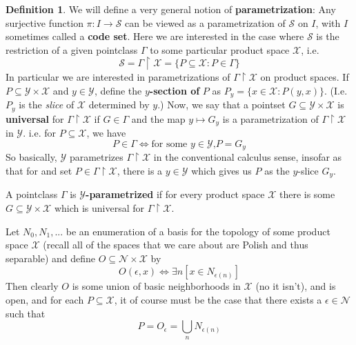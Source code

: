 \documentclass{article}
\theoremstyle{definition}
\newtheorem{definition}{Definition}[section]
\theoremstyle{plain}
\begin{document}
\begin{definition}
We will define a very general notion of \textbf{parametrization}: Any surjective function $\pi: I \to \mathcal{S}$ can be viewed as a parametrization of $\mathcal{S}$ on $I$, with $I$ sometimes called a \textbf{code set}. Here we are interested in the case where $\mathcal{S}$ is the restriction of a given pointclass $\Gamma$ to some particular product space $\mathcal{X}$, i.e. 
\[ \mathcal{S} = \Gamma  \restriction \mathcal{X} = \{P \subseteq \mathcal{X}: P \in \Gamma\} \]
In particular we are interested in parametrizations of $\Gamma \restriction \mathcal{X}$ on product spaces. If $P \subseteq \mathcal{Y} \times \mathcal{X}$ and $y \in \mathcal{Y}$, define the \textbf{$y$-section of} $P$ as $P_y = \{x \in \mathcal{X}: P(y,x)\}$. (I.e. $P_y$ is the \textit{slice} of $\mathcal{X}$ determined by $y$.) 
Now, we say that a pointset $G \subseteq \mathcal{Y} \times \mathcal{X}$ is \textbf{universal} for $\Gamma \restriction \mathcal{X}$ if $G \in \Gamma$ and the map $y \mapsto G_y$ is a parametrization of $\Gamma \restriction \mathcal{X}$ in $\mathcal{Y}$. i.e. for $P \subseteq \mathcal{X}$, we have 
\[ P \in \Gamma \iff \textrm{for some $y \in \mathcal{Y}$,} P = G_y \]
So basically, $\mathcal{Y}$ parametrizes $\Gamma \restriction \mathcal{X}$ in the conventional calculus sense, insofar as that for and set $P \in \Gamma \restriction \mathcal{X}$, there is a $y \in \mathcal{Y}$ which gives us $P$ as the  $y$-slice $G_y$. 
\par A pointclass $\Gamma$ is \textbf{$\mathcal{Y}$-parametrized} if for every product space $\mathcal{X}$ there is some $G \subseteq \mathcal{Y} \times \mathcal{X}$ which is universal for $\Gamma \restriction \mathcal{X}$.  
\end{definition}
Let $N_0,N_1,...$ be an enumeration of a basis for the topology of some product space $\mathcal{X}$ (recall all of the spaces that we care about are Polish and thus separable) and define $O \subseteq \mathcal{N} \times \mathcal{X}$ by 
\[ O(\epsilon,x) \iff \exists n[x \in N_{\epsilon(n)}] \]
Then clearly $O$ is some union of basic neighborhoods in $\mathcal{X}$ (no it isn't), and is open, and for each $P \subseteq \mathcal{X}$, it of course must be the case that there exists a $\epsilon \in \mathcal{N}$ such that 
\[ P = O_{\epsilon} = \bigcup_n N_{\epsilon(n)} \]
\end{document}
